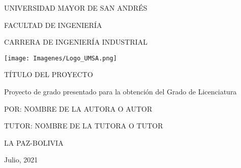 \begin{titlepage}
	\begin{center}
		{\Large UNIVERSIDAD MAYOR DE SAN ANDRÉS}
		
		{\large FACULTAD DE INGENIERÍA}
		
		{\large CARRERA DE INGENIERÍA INDUSTRIAL}
		
		\texttt{[image: Imagenes/Logo\_UMSA.png]} 
	    
		{\Large TÍTULO DEL PROYECTO}
	
		{\normalsize Proyecto de grado presentado para la obtención del Grado de Licenciatura}
	
		{\Large POR: NOMBRE DE LA AUTORA O AUTOR}
		
		\begin{large}
			TUTOR: NOMBRE DE LA TUTORA O TUTOR
		\end{large}
		
		LA PAZ-BOLIVIA
		
	    Julio, 2021

	\end{center}
\end{titlepage}